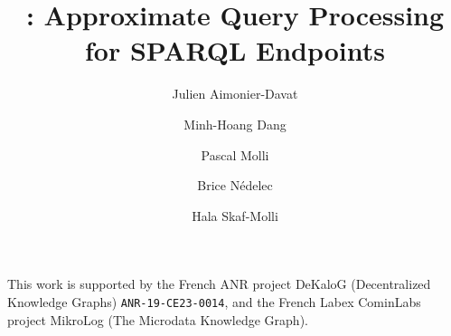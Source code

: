 \documentclass{ceurart}
\title{\NAME: Approximate Query Processing\\for SPARQL Endpoints}
\author[1]{Julien Aimonier-Davat}[%
  orcid=0000-0001-6707-0204,
  email=name@example.com,
]
\author[1]{Minh-Hoang Dang}[%
  email=name@example.com,
]
\author[1]{Pascal Molli}[%
  orcid=0000-0001-8048-273X,
]
\author[1]{Brice N{\'e}delec}[%
]
\author[1]{Hala Skaf-Molli}[%
  orcid=0000-0003-1062-6659,
]
\begin{document}


\maketitle






\begin{acknowledgments}
  This work is supported by the French ANR project DeKaloG
  (Decentralized Knowledge Graphs) \texttt{ANR-19-CE23-0014}, and the
  French Labex CominLabs project MikroLog (The Microdata Knowledge
  Graph).
\end{acknowledgments}


\end{document}
